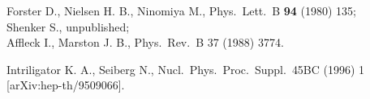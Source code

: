 \documentclass[a4paper,12pt]{article}
\begin{document}
\begin{thebibliography}{10}
Forster D., Nielsen H. B., Ninomiya M.,
Phys.\ Lett.\ B {\bf 94} (1980) 135;\\
Shenker S., unpublished;\\
Affleck I., Marston J. B., 
Phys.\ Rev.\ B {37} (1988) 3774.

Intriligator K. A., Seiberg N.,
Nucl.\ Phys.\ Proc.\ Suppl.\  {45BC} (1996) 1
[arXiv:hep-th/9509066].

\end{thebibliography}
\end{document}
